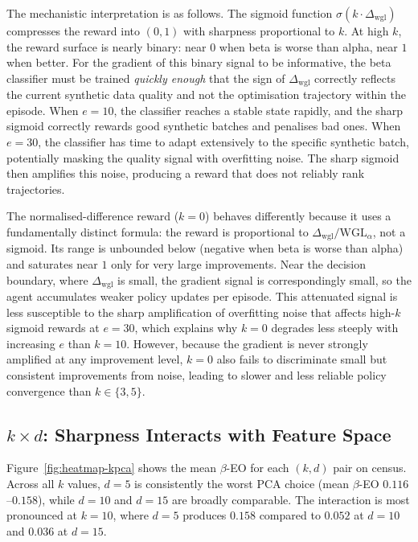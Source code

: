 \documentclass[12pt]{article}
\begin{document}
The mechanistic interpretation is as follows.
The sigmoid function $\sigma(k \cdot \Delta_\text{wgl})$ compresses
the reward into $(0, 1)$ with sharpness proportional to $k$.
At high $k$, the reward surface is nearly binary: near $0$ when beta is
worse than alpha, near $1$ when better.
For the gradient of this binary signal to be informative, the beta
classifier must be trained \emph{quickly enough} that the sign of
$\Delta_\text{wgl}$ correctly reflects the current synthetic data quality
and not the optimisation trajectory within the episode.
When $e = 10$, the classifier reaches a stable state rapidly, and the
sharp sigmoid correctly rewards good synthetic batches and penalises bad
ones.
When $e = 30$, the classifier has time to adapt extensively to the specific
synthetic batch, potentially masking the quality signal with overfitting
noise.
The sharp sigmoid then amplifies this noise, producing a reward that does
not reliably rank trajectories.

The normalised-difference reward ($k = 0$) behaves differently because it uses a
fundamentally distinct formula: the reward is proportional to
$\Delta_\text{wgl} / \text{WGL}_\alpha$, not a sigmoid.
Its range is unbounded below (negative when beta is worse than alpha) and saturates
near $1$ only for very large improvements.
Near the decision boundary, where $\Delta_\text{wgl}$ is small, the gradient
signal is correspondingly small, so the agent accumulates weaker policy updates
per episode.
This attenuated signal is less susceptible to the sharp amplification of
overfitting noise that affects high-$k$ sigmoid rewards at $e = 30$, which
explains why $k = 0$ degrades less steeply with increasing $e$ than $k = 10$.
However, because the gradient is never strongly amplified at any improvement level,
$k = 0$ also fails to discriminate small but consistent improvements from noise,
leading to slower and less reliable policy convergence than $k \in \{3, 5\}$.

\subsection{\texorpdfstring{$k \times d$}{k x d}: Sharpness Interacts with Feature Space}

Figure~\ref{fig:heatmap-kpca} shows the mean $\beta$-EO for each $(k, d)$
pair on census.
Across all $k$ values, $d = 5$ is consistently the worst PCA choice
(mean $\beta$-EO $0.116$--$0.158$), while $d = 10$ and $d = 15$ are
broadly comparable.
The interaction is most pronounced at $k = 10$, where $d = 5$ produces
$0.158$ compared to $0.052$ at $d = 10$ and $0.036$ at $d = 15$.
\end{document}
